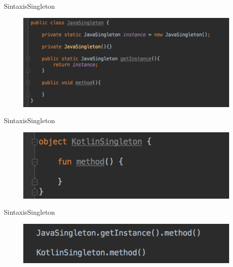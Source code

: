 \begin{frame}{Sintaxis}{Singleton}
    \begin{figure}[h]
    \centering
    \includegraphics[width=\textwidth]{images/kotlin_vs_java/java_singleton}
    \end{figure}
\end{frame}
\begin{frame}{Sintaxis}{Singleton}
    \begin{figure}[h]
    \centering
    \includegraphics[width=\textwidth]{images/kotlin_vs_java/kotlin_singleton}
    \end{figure}
\end{frame}
\begin{frame}{Sintaxis}{Singleton}
    \begin{figure}[h]
    \centering
    \includegraphics[width=\textwidth]{images/kotlin_vs_java/singleton_calls}
    \end{figure}
\end{frame}

